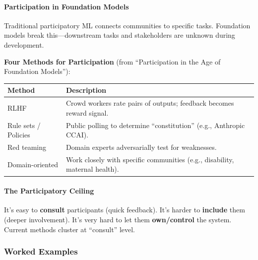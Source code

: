 \paragraph*{Participation in Foundation Models}

Traditional participatory ML connects communities to specific tasks. Foundation models break this---downstream tasks and stakeholders are unknown during development.

\textbf{Four Methods for Participation} (from ``Participation in the Age of Foundation Models''):

\begin{center}
\renewcommand{\arraystretch}{1.3}
\begin{tabular}{@{} l p{8cm} @{}}
\toprule
\textbf{Method} & \textbf{Description} \\
\midrule
RLHF & Crowd workers rate pairs of outputs; feedback becomes reward signal. \\
Rule sets / Policies & Public polling to determine ``constitution'' (e.g., Anthropic CCAI). \\
Red teaming & Domain experts adversarially test for weaknesses. \\
Domain-oriented & Work closely with specific communities (e.g., disability, maternal health). \\
\bottomrule
\end{tabular}
\end{center}

\paragraph*{The Participatory Ceiling}
It's easy to \textbf{consult} participants (quick feedback). It's harder to \textbf{include} them (deeper involvement). It's very hard to let them \textbf{own/control} the system. Current methods cluster at ``consult'' level.

\subsubsection*{Worked Examples}

